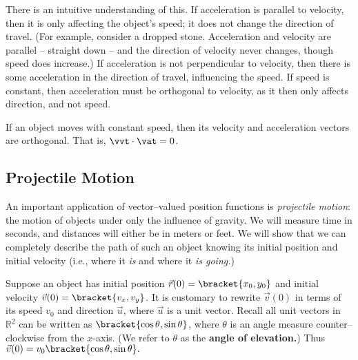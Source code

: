 There is an intuitive understanding of this. If acceleration is parallel to velocity, then it is only affecting the object's speed; it does not change the direction of travel. (For example, consider a dropped stone. Acceleration and velocity are parallel -- straight down -- and the direction of velocity never changes, though speed does increase.) If acceleration is not perpendicular to velocity, then there is some acceleration in the direction of travel, influencing the speed. If speed is constant, then acceleration must be orthogonal to velocity, as it then only affects direction, and not speed.

{If an object moves with constant speed, then its velocity and acceleration vectors are orthogonal. That is, $\vvt\cdot\vat=0$.
}


\subsection*{Projectile Motion}

An important application of vector--valued position functions is \emph{projectile motion}: the motion of objects under only the influence of gravity. We will measure time in seconds, and distances will either be in meters or feet. We will show that we can completely describe the path of such an object knowing its initial position and initial velocity (i.e., where it \emph{is} and where it \emph{is going.})

Suppose an object has initial position $\vec r(0) =\bracket{x_0,y_0}$ and initial velocity $\vec v(0) =\bracket{v_x,v_y}$. It is customary to rewrite $\vec v(0)$ in terms of its speed $v_0$ and direction $\vec u$, where $\vec u$ is a unit vector. Recall all unit vectors in $\mathbb{R}^2$ can be written as $\bracket{\cos \theta,\sin \theta}$, where $\theta$ is an angle measure counter--clockwise from the $x$-axis. (We refer to $\theta$ as the \textbf{angle of elevation.}) Thus $\vec v(0) = v_0\bracket{\cos \theta,\sin \theta}.$ 

